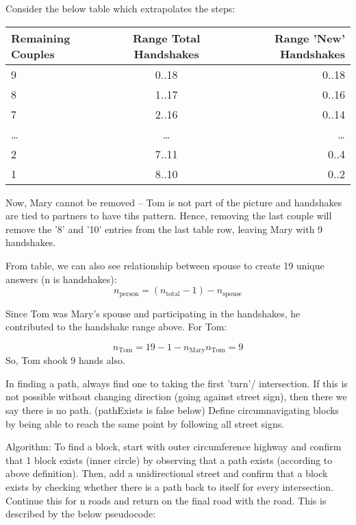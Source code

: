 \documentclass[11pt, a4paper]{article}
\begin{document}
    Consider the below table which extrapolates the steps:

\begin{tabular}{ l | c | r }
  \hline			
  Remaining Couples & Range Total Handshakes  & Range 'New' Handshakes \\
  \hline			
  9 & 0..18 & 0..18 \\
  8 & 1..17 & 0..16 \\
  7 & 2..16 & 0..14 \\
  \dots & \dots & \dots \\
  2 & 7..11 & 0..4 \\
  1 & 8..10 & 0..2 \\
  \hline  
\end{tabular}
    

Now, Mary cannot be removed -- Tom is not part of the picture and handshakes are tied to partners to have tihs pattern. Hence, removing the last couple will remove the '8' and '10' entries from the last table row, leaving Mary with 9 handshakes.

From table, we can also see relationship between spouse to create 19 unique answers (n is handshakes):
\begin{equation}
  n_\text{person} = (n_\text{total} - 1) - n_\text{spouse}
\end{equation}

 Since Tom was Mary's spouse and participating in the handshakes, he contributed to the handshake range above. For Tom:
    
\begin{equation}
  n_\text{Tom} = 19 - 1 - n_\text{Mary}
  n_\text{Tom} = 9
\end{equation}
So, Tom shook 9 hands also. 




In finding a path, always find one to taking the first 'turn'/ intersection. If this is not possible without changing direction (going against street sign), then there we say there is no path. (pathExists is false below)
Define circumnavigating blocks by being able to reach the same point by following all street signs.

Algorithm: To find a block, start with outer circumference highway and confirm that 1 block exists (inner circle) by observing that a path exists (according to above definition). Then, add a unidirectional street and confirm that a block exists by checking whether there is a path back to itself for every intersection. Continue this for n roads and return on the final road with the road.
This is described by the below pseudocode:
\end{document}
